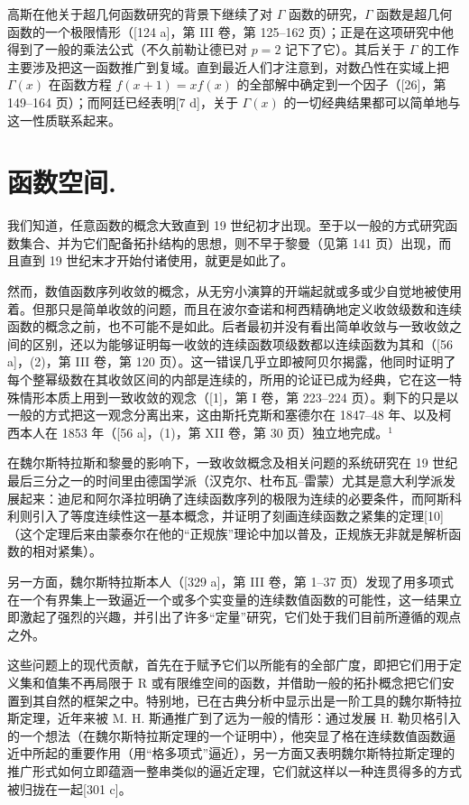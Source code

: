 高斯在他关于超几何函数研究的背景下继续了对 \(\Gamma\) 函数的研究，\(\Gamma\) 函数是超几何函数的一个极限情形（{[}124 a{]}，第 III 卷，第 125–162 页）；正是在这项研究中他得到了一般的乘法公式（不久前勒让德已对 \(p = 2\) 记下了它）。其后关于 \(\Gamma\) 的工作主要涉及把这一函数推广到复域。直到最近人们才注意到，对数凸性在实域上把 \(\Gamma(x)\) 在函数方程 \(f(x + 1) = xf(x)\) 的全部解中确定到一个因子（{[}26{]}，第 149–164 页）；而阿廷已经表明{[}7 d{]}，关于 \(\Gamma(x)\) 的一切经典结果都可以简单地与这一性质联系起来。

\chapter{函数空间.}

我们知道，任意函数的概念大致直到 19 世纪初才出现。至于以一般的方式研究函数集合、并为它们配备拓扑结构的思想，则不早于黎曼（见第 141 页）出现，而且直到 19 世纪末才开始付诸使用，就更是如此了。

然而，数值函数序列收敛的概念，从无穷小演算的开端起就或多或少自觉地被使用着。但那只是简单收敛的问题，而且在波尔查诺和柯西精确地定义收敛级数和连续函数的概念之前，也不可能不是如此。后者最初并没有看出简单收敛与一致收敛之间的区别，还以为能够证明每一收敛的连续函数项级数都以连续函数为其和（{[}56 a{]}，(2)，第 III 卷，第 120 页）。这一错误几乎立即被阿贝尔揭露，他同时证明了每个整幂级数在其收敛区间的内部是连续的，所用的论证已成为经典，它在这一特殊情形本质上用到一致收敛的观念（{[}1{]}，第 I 卷，第 223–224 页）。剩下的只是以一般的方式把这一观念分离出来，这由斯托克斯和塞德尔在 1847–48 年、以及柯西本人在 1853 年（{[}56 a{]}，(1)，第 XII 卷，第 30 页）独立地完成。\(^{1}\)

在魏尔斯特拉斯和黎曼的影响下，一致收敛概念及相关问题的系统研究在 19 世纪最后三分之一的时间里由德国学派（汉克尔、杜布瓦–雷蒙）尤其是意大利学派发展起来：迪尼和阿尔泽拉明确了连续函数序列的极限为连续的必要条件，而阿斯科利则引入了等度连续性这一基本概念，并证明了刻画连续函数之紧集的定理{[}10{]}（这个定理后来由蒙泰尔在他的“正规族”理论中加以普及，正规族无非就是解析函数的相对紧集）。

另一方面，魏尔斯特拉斯本人（{[}329 a{]}，第 III 卷，第 1–37 页）发现了用多项式在一个有界集上一致逼近一个或多个实变量的连续数值函数的可能性，这一结果立即激起了强烈的兴趣，并引出了许多“定量”研究，它们处于我们目前所遵循的观点之外。

这些问题上的现代贡献，首先在于赋予它们以所能有的全部广度，即把它们用于定义集和值集不再局限于 R 或有限维空间的函数，并借助一般的拓扑概念把它们安置到其自然的框架之中。特别地，已在古典分析中显示出是一阶工具的魏尔斯特拉斯定理，近年来被 M. H. 斯通推广到了远为一般的情形：通过发展 H. 勒贝格引入的一个想法（在魏尔斯特拉斯定理的一个证明中），他突显了格在连续数值函数逼近中所起的重要作用（用“格多项式”逼近），另一方面又表明魏尔斯特拉斯定理的推广形式如何立即蕴涵一整串类似的逼近定理，它们就这样以一种连贯得多的方式被归拢在一起{[}301 c{]}。

